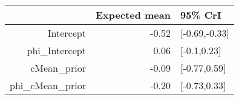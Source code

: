 \begin{tabular}{rrl}
  \hline
 & Expected mean & 95\% CrI \\ 
  \hline
Intercept & -0.52 & [-0.69,-0.33] \\ 
  phi\_Intercept & 0.06 & [-0.1,0.23] \\ 
  cMean\_prior & -0.09 & [-0.77,0.59] \\ 
  phi\_cMean\_prior & -0.20 & [-0.73,0.33] \\ 
   \hline
\end{tabular}

